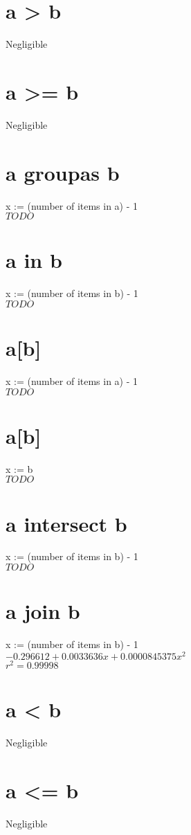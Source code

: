 \documentclass[12pt]{article}
\begin{document}
	\section{a > b}
	Negligible
	
	\section{a >= b}
	Negligible
	
	\section{a groupas b}
	x := (number of items in a) - 1\\
	$TODO$
	
	\section{a in b}
	x := (number of items in b) - 1\\
	$TODO$
	
	\section{a[b]}
	x := (number of items in a) - 1\\
	$TODO$
	
	\section{a[b]}
	x := b\\
	$TODO$
	
	\section{a intersect b}
	x := (number of items in b) - 1\\
	$TODO$
	
	\section{a join b}
	x := (number of items in b) - 1\\
	$-0.296612 + 0.0033636x + 0.0000845375x^2$\\
	$r^2 = 0.99998$
	
	\section{a < b}
	Negligible
	
	\section{a <= b}
	Negligible
	
\end{document}
